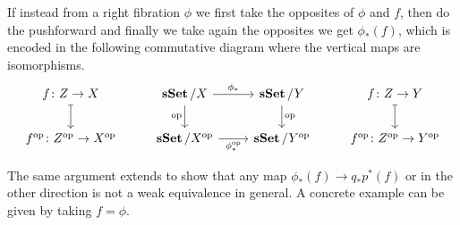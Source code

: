 \documentclass[a4paper,12pt]{scrartcl}
\begin{document}
If instead from a right fibration $\phi$ we first take the opposites of $\phi$
and $f$, then do the pushforward and finally we take again the opposites we get
$\phi_*(f)$, which is encoded in the following commutative diagram where the
vertical maps are isomorphisms.
\[\begin{tikzcd}
	{f\colon Z\rightarrow X} & {\sSet/X} & {\sSet/Y} & {f\colon Z\rightarrow Y} \\
	{f^{\op}\colon Z^{\op}\rightarrow X^{\op}} & {\sSet/X^{\op}} & {\sSet/Y^{\op}} & {f^{\op}\colon Z^{\op}\rightarrow Y^{\op}}
	\arrow["\op", from=1-3, to=2-3]
	\arrow["\op"', from=1-2, to=2-2]
	\arrow["{\phi^{\op}_*}"', from=2-2, to=2-3]
	\arrow["{\phi_*}", from=1-2, to=1-3]
	\arrow[maps to, from=1-1, to=2-1]
	\arrow[maps to, from=1-4, to=2-4]
\end{tikzcd}\]

The same argument extends to show that any map $\phi_*(f)\rightarrow q_*p^*(f)$
or in the other direction is not a weak equivalence in general. A concrete
example can be given by taking $f=\phi$.


\printbibliography
\end{document}
